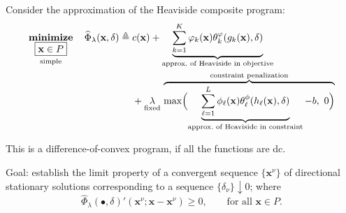\documentclass[aspectratio=169,xcolor=dvipsnames]{beamer}
\begin{document}
\begin{frame}
  \footnotesize
  \setlength{\abovedisplayskip}{4pt}
  \setlength{\belowdisplayskip}{4pt}

  Consider the approximation of the Heaviside composite program:
  \[
    \begin{aligned}
      \operatorname*{\textbf{minimize}}_{\substack{\boxed{\mathbf{x}\in P}\\[2pt]
        \text{\scriptsize simple}}}\quad
      \widehat{\Phi}_\lambda(\mathbf{x},\delta)\triangleq{}&c(\mathbf{x})
        +\underbrace{\sum_{k=1}^{K}\varphi_k(\mathbf{x})
          \theta_k^\varphi(g_k(\mathbf{x}),\delta)}_{
          \text{approx.\ of Heaviside in objective}}\\
      &+\underset{\text{\scriptsize fixed}}{\lambda}\,
        \overbrace{\max\Bigl(\underbrace{\sum_{\ell=1}^{L}
          \phi_\ell(\mathbf{x})\theta_\ell^\phi(h_\ell(\mathbf{x}),\delta)}_{
          \text{approx.\ of Heaviside in constraint}}-b,\ 0\Bigr)}^{
          \text{constraint penalization}}
    \end{aligned}
  \]

  \vspace{0.10cm}
  This is a difference-of-convex program, if all the functions are dc.

  \vspace{0.06cm}
  \textcolor{MediumRed}{Goal:} establish the limit property of a convergent
  sequence $\{\mathbf{x}^\nu\}$ of directional stationary solutions
  corresponding to a sequence $\{\delta_\nu\}\downarrow 0$; where
  \[
    \widehat{\Phi}_\lambda(\bullet,\delta)'(\mathbf{x}^\nu;
      \mathbf{x}-\mathbf{x}^\nu)\geq 0,\qquad\text{for all }\mathbf{x}\in P.
  \]
\end{frame}
\end{document}

